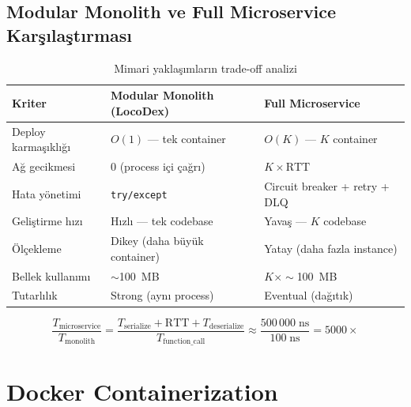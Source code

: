 \subsection{Modular Monolith ve Full Microservice Kar\c{s}{\i}la\c{s}t{\i}rmas{\i}}
\label{sec:monolith-tradeoff}

\begin{table}[H]
\centering
\caption{Mimari yakla\c{s}{\i}mlar{\i}n trade-off analizi}
\label{tab:monolith-micro}
\begin{tabularx}{\textwidth}{lXX}
\toprule
\color{chapterBlue}\textbf{Kriter} & \color{chapterBlue}\textbf{Modular Monolith (LocoDex)} & \color{chapterBlue}\textbf{Full Microservice} \\
\midrule
Deploy karma\c{s}{\i}kl{\i}\u{g}{\i} & $O(1)$ --- tek container      & $O(K)$ --- $K$ container \\
A\u{g} gecikmesi         & 0 (process i\c{c}i \c{c}a\u{g}r{\i})     & $K \times \text{RTT}$ \\
Hata y\"{o}netimi          & \texttt{try/except}             & Circuit breaker + retry + DLQ \\
Geli\c{s}tirme h{\i}z{\i}       & H{\i}zl{\i} --- tek codebase        & Yava\c{s} --- $K$ codebase \\
\"{O}l\c{c}ekleme             & Dikey (daha b\"{u}y\"{u}k container) & Yatay (daha fazla instance) \\
Bellek kullan{\i}m{\i}      & $\sim$100~MB                    & $K \times \sim$100~MB \\
Tutarl{\i}l{\i}k            & Strong (ayn{\i} process)         & Eventual (da\u{g}{\i}t{\i}k) \\
\bottomrule
\end{tabularx}
\end{table}

\begin{equation}
\label{eq:monolith-vs-micro}
\frac{T_{\mathrm{microservice}}}{T_{\mathrm{monolith}}} = \frac{T_{\mathrm{serialize}} + \text{RTT} + T_{\mathrm{deserialize}}}{T_{\mathrm{function\_call}}} \approx \frac{500\,000\;\text{ns}}{100\;\text{ns}} = 5000\times
\end{equation}


\section{Docker Containerization}
\label{sec:docker}

